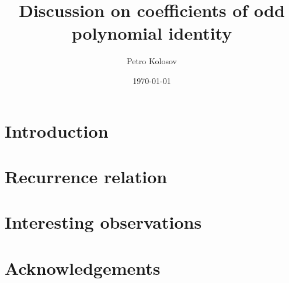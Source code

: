 \documentclass[10pt,letterpaper,oneside,reqno]{amsart}
\title[Discussion on coefficients of odd polynomial identity]
{Discussion on coefficients of odd polynomial identity}
\author[Petro Kolosov]{Petro Kolosov}
\date{\today}
\begin{document}
%        

    \maketitle


    \section{Introduction}\label{sec:introduction}
    


    \section{Recurrence relation}\label{sec:recurrence-relation}
    


%    

    \section{Interesting observations}\label{sec:interesting-observations}
    

    \section{Acknowledgements}\label{sec:acknowledgements}
    

    
    
\end{document}
